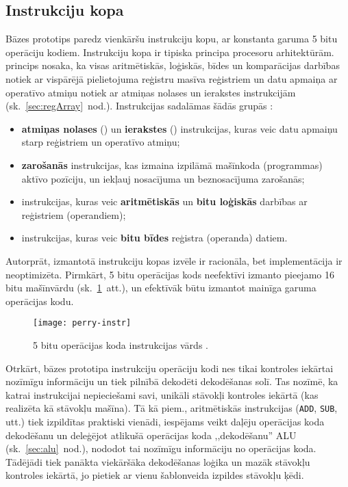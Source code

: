 \subsection{Instrukciju kopa} \label{sec:perry-instr}
	Bāzes prototips paredz vienkāršu instrukciju kopu, ar konstanta garuma
	5 bitu operāciju kodiem. Instrukciju kopa ir tipiska 
	principa procesoru arhitektūrām.  princips nosaka, ka
	visas aritmētiskās, loģiskās, bīdes un komparācijas darbības notiek
	ar vispārējā pielietojuma reģistru masīva reģistriem un datu apmaiņa ar
	operatīvo atmiņu notiek ar atmiņas nolases un ierakstes instrukcijām
	\cite[11.~lpp.]{Flynn-arch}	(sk.~\ref{sec:regArray}~nod.).
	Instrukcijas sadalāmas šādās grupās \cite[291.~lpp.]{Perry-VHDL}:
	\begin{itemize}
		\item \textbf{atmiņas nolases} () un \textbf{ierakstes}
			() instrukcijas, kuras
			veic datu apmaiņu starp reģistriem un operatīvo atmiņu;
		\item \textbf{zarošanās} instrukcijas, kas izmaina
			izpilāmā mašīnkoda (programmas) aktīvo pozīciju, un iekļauj
			nosacījuma un beznosacījuma zarošanās;
		\item instrukcijas, kuras veic \textbf{aritmētiskās} un 
			\textbf{bitu loģiskās} darbības ar reģistriem (operandiem);
		\item instrukcijas, kuras veic \textbf{bitu bīdes} reģistra
			(operanda) datiem.
	\end{itemize}
	
	Autorprāt, izmantotā instrukciju kopas izvēle ir racionāla, bet
	implementācija ir neoptimizēta. Pirmkārt, 5 bitu operācijas kods
	neefektīvi izmanto pieejamo 16 bitu mašīnvārdu
	(sk.~\ref{fig:5bit-opcode}~att.), un efektīvāk būtu izmantot mainīga
	garuma operācijas kodu.
	\begin{figure}[thb]
		\centering
		\texttt{[image: perry-instr]}
		\caption[5 bitu operācijas koda instrukcijas vārds.]
		        {5 bitu operācijas koda instrukcijas vārds \cite[292.~lpp.]{Perry-VHDL}.}
		\label{fig:5bit-opcode}
	\end{figure}
	
	Otrkārt, bāzes prototipa instrukciju operāciju kodi nes tikai kontroles
	iekārtai nozīmīgu informāciju un tiek pilnībā dekodēti dekodēšanas solī.
	Tas nozīmē, ka katrai instrukcijai nepieciešami savi, unikāli stāvokļi
	kontroles iekārtā (kas realizēta kā stāvokļu mašīna). Tā kā piem., 
	aritmētiskās instrukcijas (\texttt{ADD}, \texttt{SUB}, utt.)
	tiek izpildītas praktiski vienādi, iespējams veikt daļēju operācijas
	koda dekodēšanu un deleģējot atlikušā operācijas koda ,,dekodēšanu''
	ALU (sk.~\ref{sec:alu}~nod.), nododot tai nozīmīgu informāciju no
	operācijas koda. Tādējādi tiek panākta viekāršāka dekodēšanas loģika un 
	mazāk stāvokļu kontroles iekārtā, jo pietiek ar vienu šablonveida
	izpildes stāvokļu ķēdi.
	
